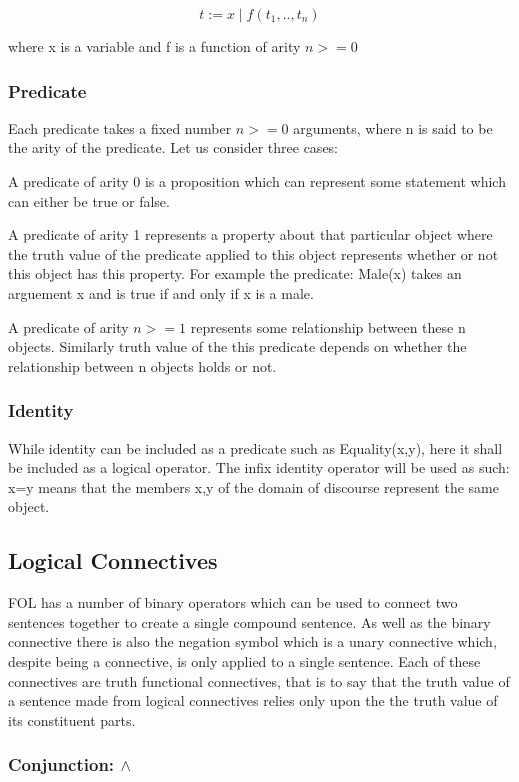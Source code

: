 $$ t:= x \mid f(t_1,..,t_n)$$

where x is a variable and f is a function of arity $n>=0$

\subsubsection*{Predicate}

Each predicate takes a fixed number $n>=0$ arguments, where n is said to be the arity of the predicate. Let us consider three cases:

A predicate of arity 0 is a proposition which can represent some statement which can either be true or false.

A predicate of arity 1 represents a property about that particular object where the truth value of the predicate applied to this object represents whether or not this object has this property. For example the predicate: Male(x) takes an arguement x and is true if and only if x is a male.

A predicate of arity $n >=1$ represents some relationship between these n objects. Similarly truth value of the this predicate depends on whether the relationship between n objects holds or not.

\subsubsection*{Identity}

While identity can be included as a predicate such as Equality(x,y), here it shall be included as a logical operator. The infix identity operator will be used as such: x=y means that the members x,y of the domain of discourse represent the same object. 

\subsection*{Logical Connectives}

FOL has a number of binary operators which can be used to connect two sentences together to create a single compound sentence. As well as the binary connective there is also the negation symbol which is a unary connective which, despite being a connective, is only applied to a single sentence. Each of these connectives are truth functional connectives, that is to say that the truth value of a sentence made from logical connectives relies only upon the the truth value of its constituent parts.

\subsubsection*{Conjunction: $\land$}

